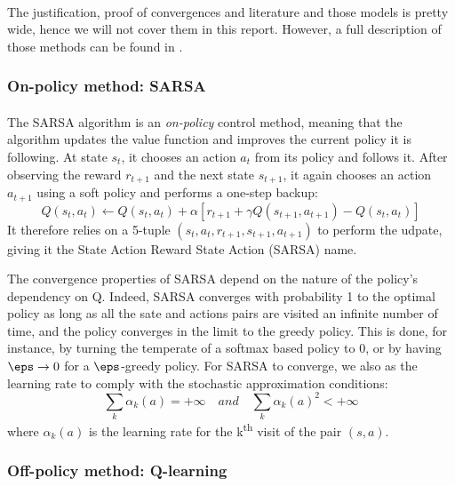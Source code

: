 {{{			\paragraph{} The justification, proof of convergences and literature and those models is pretty wide, hence we will not cover them in this report. However, a full description of those methods can be found in \cite{sutton1998reinforcement}. 
			
			\subsubsection{On-policy method: SARSA}
			{
				\paragraph{} The SARSA algorithm is an \emph{on-policy} control method, meaning that the algorithm updates the value function and improves the current policy it is following. At state $s_t$, it chooses an action $a_t$ from its policy and follows it. After observing the reward $r_{t+1}$ and the next state $s_{t+1}$, it again chooses an action $a_{t+1}$ using a soft policy and performs a one-step backup: 
				\begin{equation}
					Q(s_t,a_t) \leftarrow Q(s_t,a_t) + \alpha\left[r_{t+1} + \gamma Q(s_{t+1},a_{t+1}) - Q(s_t,a_t)\right]
				\end{equation}
				It therefore relies on a 5-tuple $(s_t,a_t,r_{t+1},s_{t+1},a_{t+1})$ to perform the udpate, giving it the State Action Reward State Action (SARSA) name. 
				
				The convergence properties of SARSA depend on the nature of the policy's dependency on Q. Indeed, SARSA converges with probability 1 to the optimal policy as long as all the sate and actions pairs are visited an infinite number of time, and the policy converges in the limit to the greedy policy. This is done, for instance, by turning the temperate of a softmax based policy to 0, or by having $\eps\to 0$ for a $\eps$-greedy policy. For SARSA to converge, we also as the learning rate to comply with the stochastic approximation conditions: 
					\begin{equation}
						\sum_k \alpha_k(a) = +\infty \quad { and } \quad \sum_k \alpha_k(a)^2 < +\infty
					\end{equation}
					where $\alpha_k(a)$ is the learning rate for the k\textsuperscript{th} visit of the pair $(s,a)$. 
					
			}
			\subsubsection{Off-policy method: Q-learning}
			{
}}}}

